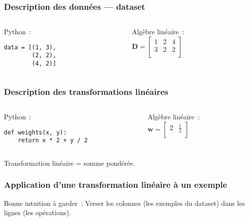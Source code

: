 \begin{frame}[fragile]
  \frametitle{Description des données — dataset}
  \begin{columns}
    \begin{column}{0.5\textwidth}
      Python :
      \begin{verbatim}
data = [(1, 3),
        (2, 2),
        (4, 2)]
      \end{verbatim}
    \end{column}
    \begin{column}{0.5\textwidth}
      Algèbre linéaire : \\[.3cm]

      \(
      \mathbf{D} = \begin{bmatrix}
        1 & 2 & 4 \\
        3 & 2 & 2 \\
      \end{bmatrix}
      \)
    \end{column}
  \end{columns}
\end{frame}

\begin{frame}[fragile]
  \frametitle{Description des transformations linéaires}
  \begin{columns}
    \begin{column}{0.5\textwidth}
      Python :
\begin{verbatim}
def weights(x, y):
    return x * 2 + y / 2
\end{verbatim}
    \end{column}
    \begin{column}{0.5\textwidth}
      Algèbre linéaire : \\[.3cm]

      \(
      \mathbf{w} = \begin{bmatrix}
        2 & \frac{1}{2} \\
      \end{bmatrix}
      \)
    \end{column}
  \end{columns}
  \vfill
  Transformation linéaire = somme pondérée.
\end{frame}

\begin{frame}
  \frametitle{Application d'une transformation linéaire à un exemple}


  Bonne intuition à garder : Verser les colonnes (les exemples du
  dataset) dans les lignes (les opérations).
\end{frame}

